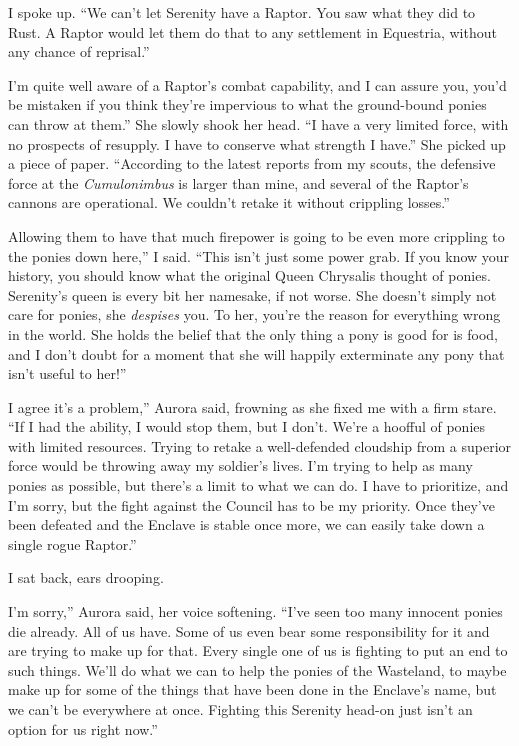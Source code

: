I spoke up. “We can’t let Serenity have a Raptor. You saw what they did to Rust. A Raptor would let them do that to any settlement in Equestria, without any chance of reprisal.”

\leavevmode{}I’m quite well aware of a Raptor’s combat capability, and I can assure you, you’d be mistaken if you think they’re impervious to what the ground-bound ponies can throw at them.” She slowly shook her head. “I have a very limited force, with no prospects of resupply. I have to conserve what strength I have.” She picked up a piece of paper. “According to the latest reports from my scouts, the defensive force at the \textit{Cumulonimbus} is larger than mine, and several of the Raptor’s cannons are operational. We couldn’t retake it without crippling losses.”

\leavevmode{}Allowing them to have that much firepower is going to be even more crippling to the ponies down here,” I said. “This isn’t just some power grab. If you know your history, you should know what the original Queen Chrysalis thought of ponies. Serenity’s queen is every bit her namesake, if not worse. She doesn’t simply not care for ponies, she \textit{despises} you. To her, you’re the reason for everything wrong in the world. She holds the belief that the only thing a pony is good for is food, and I don’t doubt for a moment that she will happily exterminate any pony that isn’t useful to her!”

\leavevmode{}I agree it’s a problem,” Aurora said, frowning as she fixed me with a firm stare. “If I had the ability, I would stop them, but I don’t. We’re a hoofful of ponies with limited resources. Trying to retake a well-defended cloudship from a superior force would be throwing away my soldier’s lives. I’m trying to help as many ponies as possible, but there’s a limit to what we can do. I have to prioritize, and I’m sorry, but the fight against the Council has to be my priority. Once they’ve been defeated and the Enclave is stable once more, we can easily take down a single rogue Raptor.”

I sat back, ears drooping.

\leavevmode{}I’m sorry,” Aurora said, her voice softening. “I’ve seen too many innocent ponies die already. All of us have. Some of us even bear some responsibility for it and are trying to make up for that. Every single one of us is fighting to put an end to such things. We’ll do what we can to help the ponies of the Wasteland, to maybe make up for some of the things that have been done in the Enclave’s name, but we can’t be everywhere at once. Fighting this Serenity head-on just isn’t an option for us right now.”

